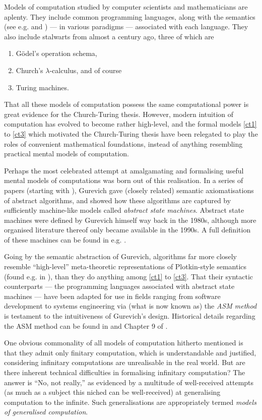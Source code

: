 \documentclass[12pt]{article}
\numberwithin{equation}{section}
\begin{document}
Models of computation studied by computer scientists and mathematicians are aplenty. They include common programming languages, along with the semantics (see e.g.\cite{scott} and \cite{meyer}) --- in various paradigms --- associated with each language. They also include stalwarts from almost a century ago, three of which are
\begin{enumerate}[leftmargin=40pt, label=(CT\arabic*)]
    \item\label{ct1} G\"{o}del's operation schema,
    \item Church's $\lambda$-calculus, and of course
    \item\label{ct3} Turing machines.
\end{enumerate}
That all these models of computation possess the same computational power is great evidence for the Church-Turing thesis. However, modern intuition of computation has evolved to become rather high-level, and the formal models \ref{ct1} to \ref{ct3} which motivated the Church-Turing thesis have been relegated to play the roles of convenient mathematical foundations, instead of anything resembling practical mental models of computation.

Perhaps the most celebrated attempt at amalgamating and formalising useful mental models of computations was born out of this realisation. In a series of papers (starting with \cite{gurevich}), Gurevich gave (closely related) semantic axiomatisations of abstract algorithms, and showed how these algorithms are captured by sufficiently machine-like models called \textit{abstract state machines}. Abstract state machines were defined by Gurevich himself way back in the 1980s, although more organised literature thereof only became available in the 1990s. A full definition of these machines can be found in e.g. \cite{evolvingalg}.

Going by the semantic abstraction of Gurevich, algorithms far more closely resemble ``high-level'' meta-theoretic representations of Plotkin-style semantics (found e.g. in \cite{plotkin}), than they do anything among \ref{ct1} to \ref{ct3}. That their syntactic counterparts --- the programming languages associated with abstract state machines --- have been adapted for use in fields ranging from software development to systems engineering via (what is now known as) the \textit{ASM method} is testament to the intuitiveness of Gurevich's design. Historical details regarding the ASM method can be found in \cite{borger} and Chapter 9 of \cite{borgerbook}.

One obvious commonality of all models of computation hitherto mentioned is that they admit only finitary computation, which is understandable and justified, considering infinitary computations are unrealisable in the real world. But are there inherent technical difficulties in formalising infinitary computation? The answer is ``No, not really,'' as evidenced by a multitude of well-received attempts (as much as a subject this niched can be well-received) at generalising computation to the infinite. Such generalisations are appropriately termed \textit{models of generalised computation}.
\end{document}
